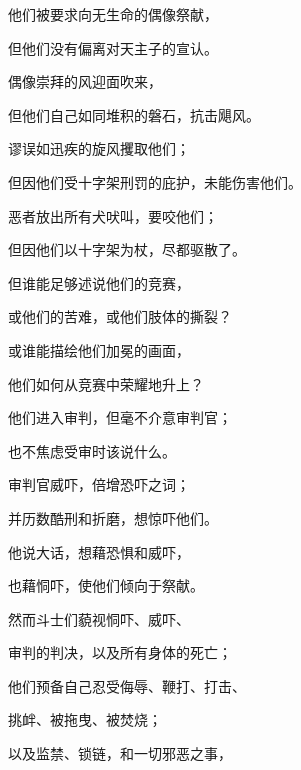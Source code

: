 他们被要求向无生命的偶像祭献，\par

但他们没有偏离对天主子的宣认。\par

偶像崇拜的风迎面吹来，\par

但他们自己如同堆积的磐石，抗击飓风。\par

谬误如迅疾的旋风攫取他们；\par

但因他们受十字架刑罚的庇护，未能伤害他们。\par

恶者放出所有犬吠叫，要咬他们；\par

但因他们以十字架为杖，尽都驱散了。\par

但谁能足够述说他们的竞赛，\par

或他们的苦难，或他们肢体的撕裂？\par

或谁能描绘他们加冕的画面，\par

他们如何从竞赛中荣耀地升上？\par

他们进入审判，但毫不介意审判官；\par

也不焦虑受审时该说什么。\par

审判官威吓，倍增恐吓之词；\par

并历数酷刑和折磨，想惊吓他们。\par

他说大话，想藉恐惧和威吓，\par

也藉恫吓，使他们倾向于祭献。\par

然而斗士们藐视恫吓、威吓、\par

审判的判决，以及所有身体的死亡；\par

他们预备自己忍受侮辱、鞭打、打击、\par

挑衅、被拖曳、被焚烧；\par

以及监禁、锁链，和一切邪恶之事，\par


